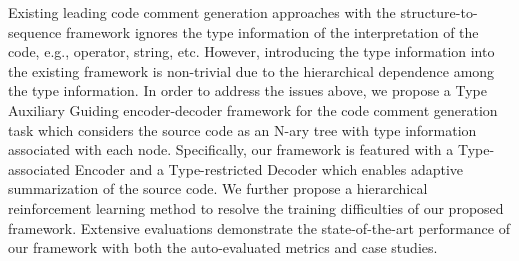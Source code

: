 Existing leading code comment generation approaches with the structure-to-sequence framework ignores the type information of the interpretation of the code, e.g., operator, string, etc. However, introducing the type information into the existing framework is non-trivial due to the hierarchical dependence among the type information. In order to address the issues above, we propose a Type Auxiliary Guiding encoder-decoder framework for the code comment generation task which considers the source code as an N-ary tree with type information associated with each node. Specifically, our framework is featured with a Type-associated Encoder and a Type-restricted Decoder which enables adaptive summarization of the source code. We further propose a hierarchical reinforcement learning method to resolve the training difficulties of our proposed framework. Extensive evaluations demonstrate the state-of-the-art performance of our framework with both the auto-evaluated metrics and case studies.
